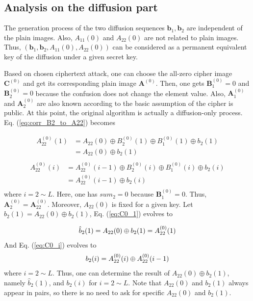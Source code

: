 \documentclass[final,3p,times]{elsarticle}
\begin{document}
\subsection{Analysis on the diffusion part}
The generation process of the two diffusion sequences $\bm{b}_1,\bm{b}_2$ are independent of the plain images. Also, $A_{11}(0)$ and $A_{22}(0)$ are not related to plain images. Thus, $(\bm{b}_1,\bm{b}_2,A_{11}(0),A_{22}(0))$ can be considered as a permanent equivalent key of the diffusion under a given secret key. 


Based on chosen ciphertext attack, one can choose the all-zero cipher image $\bm{C}^{(0)}$ and get its corresponding plain image $\bm{A}^{(0)}$. Then, one gets $\bm{B}_1^{(0)}=0$ and $\bm{B}_2^{(0)}=0$ because the confusion does not change the element value. Also, $\bm{A}_1^{(0)}$ and $\bm{A}_2^{(0)}$ are also known according to the basic assumption of the cipher is public. At this point, the original algorithm is actually a diffusion-only process.
Eq. (\ref{eq:corr_B2_to_A22}) becomes

\begin{equation}
\begin{aligned}
A_{22}^{(0)}(1) & = A_{22}(0) \oplus B_2^{(0)}(1) \oplus B_{1}^{(0)}(1) \oplus b_{2}(1)\\
& = A_{22}(0) \oplus b_{2}(1)\\
\end{aligned}
\label{eq:C0_1}	
\end{equation}
\begin{equation}
\begin{aligned}
A_{22}^{(0)}(i) & = A_{22}^{(0)}(i-1) \oplus B_2^{(0)}(i) \oplus B_{1}^{(0)}(i) \oplus b_{2}(i)\\
& = A_{22}^{(0)}(i-1) \oplus b_{2}(i)\\
\end{aligned}
\label{eq:C0_i}	
\end{equation}
where $i=2 \sim L$. Here, one has $sum_2=0$ because $\bm{B}_1^{(0)}=0$. Thus, $\bm{A}_2^{(0)}=\bm{A}_{22}^{(0)}$. Moreover, $A_{22}(0)$ is fixed for a given key. Let $\hat{b}_{2}(1)=A_{22}(0) \oplus b_{2}(1)$, Eq. (\ref{eq:C0_1}) evolves to

\begin{equation*}
\hat{b}_{2}(1)=A_{22}(0) \oplus b_{2}(1)=A_{22}^{(0)}(1) \\
\end{equation*}
And Eq. (\ref{eq:C0_i}) evolves to
\begin{equation*}
b_{2}(i) = A_{22}^{(0)}(i) \oplus A_{22}^{(0)}(i-1) \\
\end{equation*}
where $i=2 \sim L$. Thus, one can determine the result of $A_{22}(0) \oplus b_{2}(1)$, namely $\hat{b}_{2}(1)$, and $b_{2}(i)$ for $i=2 \sim L$. Note that $A_{22}(0)$ and $b_{2}(1)$ always appear in pairs, so there is no need to ask for specific $A_{22}(0)$ and $b_{2}(1)$.
\end{document}
